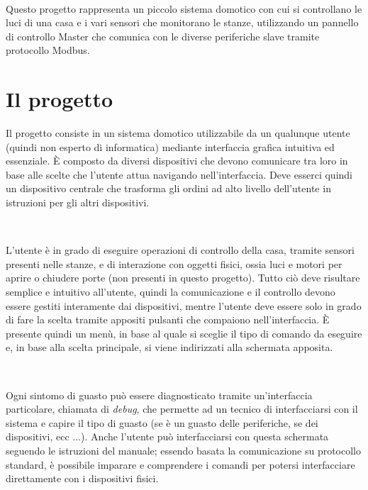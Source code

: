 \documentclass[a4paper,titlepage]{book}
\begin{document}
~

Questo progetto rappresenta un piccolo sistema domotico con cui si controllano le luci di una casa e i vari sensori che monitorano le stanze, utilizzando un pannello di controllo Master che comunica con le diverse periferiche slave tramite protocollo Modbus.


\tableofcontents




\chapter{Il progetto}

Il progetto consiste in un sistema domotico utilizzabile da un qualunque utente (quindi non esperto di informatica) mediante interfaccia grafica intuitiva ed essenziale. È composto da diversi dispositivi che devono comunicare tra loro in base alle scelte che l'utente attua navigando nell'interfaccia. Deve esserci quindi un dispositivo centrale che trasforma gli ordini ad alto livello dell'utente in istruzioni per gli altri dispositivi.

~

L'utente è in grado di eseguire operazioni di controllo della casa, tramite sensori presenti nelle stanze, e di interazione con oggetti fisici, ossia luci e motori per aprire o chiudere porte (non presenti in questo progetto). Tutto ciò deve risultare semplice e intuitivo all'utente, quindi la comunicazione e il controllo devono essere gestiti interamente dai dispositivi, mentre l'utente deve essere solo in grado di fare la scelta tramite appositi pulsanti che compaiono nell'interfaccia. È presente quindi un menù, in base al quale si sceglie il tipo di comando da eseguire e, in base alla scelta principale, si viene indirizzati alla schermata apposita.

~

Ogni sintomo di guasto può essere diagnosticato tramite un'interfaccia particolare, chiamata di \textit{debug}, che permette ad un tecnico di interfacciarsi con il sistema e capire il tipo di guasto (se è un guasto delle periferiche, se dei dispositivi, ecc ...). Anche l'utente può interfacciarsi con questa schermata seguendo le istruzioni del manuale; essendo basata la comunicazione su protocollo standard, è possibile imparare e comprendere i comandi per potersi interfacciare direttamente con i dispositivi fisici.  
\end{document}
